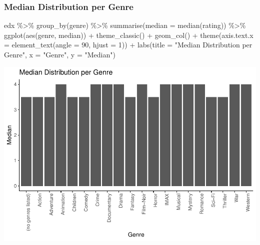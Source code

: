 \documentclass[
]{article}
\newenvironment{Shaded}{}{}
\newcommand{\AttributeTok}[1]{\textcolor[rgb]{0.49,0.56,0.16}{#1}}
\newcommand{\DecValTok}[1]{\textcolor[rgb]{0.25,0.63,0.44}{#1}}
\newcommand{\FunctionTok}[1]{\textcolor[rgb]{0.02,0.16,0.49}{#1}}
\newcommand{\NormalTok}[1]{#1}
\newcommand{\SpecialCharTok}[1]{\textcolor[rgb]{0.25,0.44,0.63}{#1}}
\newcommand{\StringTok}[1]{\textcolor[rgb]{0.25,0.44,0.63}{#1}}
\begin{document}
\hypertarget{median-distribution-per-genre}{%
\subsubsection{Median Distribution per
Genre}\label{median-distribution-per-genre}}

\begin{Shaded}
\begin{Highlighting}[]
\NormalTok{edx }\SpecialCharTok{\%\textgreater{}\%}
   \FunctionTok{group\_by}\NormalTok{(genre) }\SpecialCharTok{\%\textgreater{}\%}
   \FunctionTok{summarise}\NormalTok{(}\AttributeTok{median =} \FunctionTok{median}\NormalTok{(rating)) }\SpecialCharTok{\%\textgreater{}\%}
   \FunctionTok{ggplot}\NormalTok{(}\FunctionTok{aes}\NormalTok{(genre, median)) }\SpecialCharTok{+}
   \FunctionTok{theme\_classic}\NormalTok{()  }\SpecialCharTok{+}
   \FunctionTok{geom\_col}\NormalTok{() }\SpecialCharTok{+}
   \FunctionTok{theme}\NormalTok{(}\AttributeTok{axis.text.x =} \FunctionTok{element\_text}\NormalTok{(}\AttributeTok{angle =} \DecValTok{90}\NormalTok{, }\AttributeTok{hjust =} \DecValTok{1}\NormalTok{)) }\SpecialCharTok{+}
   \FunctionTok{labs}\NormalTok{(}\AttributeTok{title =} \StringTok{"Median Distribution per Genre"}\NormalTok{,}
        \AttributeTok{x =} \StringTok{"Genre"}\NormalTok{,}
        \AttributeTok{y =} \StringTok{"Median"}\NormalTok{)}
\end{Highlighting}
\end{Shaded}

\begin{center}\includegraphics{MovieLens-Project-Code_files/figure-latex/unnamed-chunk-33-1} \end{center}
\end{document}
